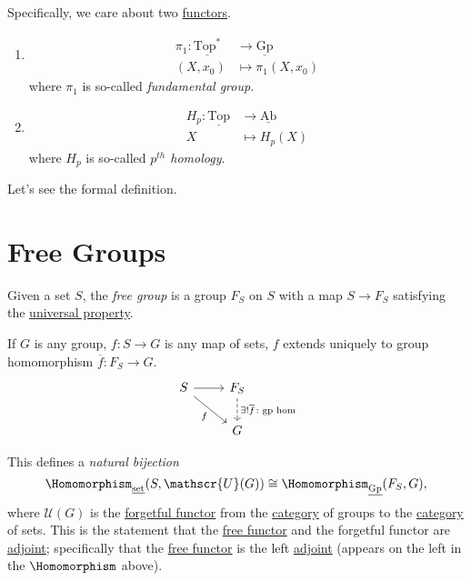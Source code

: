 \begin{remark}
	Specifically, we care about two \hyperref[def:functor]{functors}.
	\begin{enumerate}
		\item
		      \[
			      \begin{split}
				      \pi _1\colon \underline{\mathrm{Top}^*} &\to \underline{\mathrm{Gp}} \\
				      (X, x_0)&\mapsto \pi_1(X, x_0)
			      \end{split}
		      \]
		      where \(\pi _1\) is so-called \emph{fundamental group}.
		\item
		      \[
			      \begin{split}
				      H_p\colon \underline{\mathrm{Top}} &\to \underline{\mathrm{Ab}} \\
				      X&\mapsto H_{p} (X)
			      \end{split}
		      \]
		      where \(H_{p}\) is so-called \emph{\(p^{th}\) homology}.
	\end{enumerate}
\end{remark}

Let's see the formal definition.

\section{Free Groups}
\begin{definition}\label{def:free-group}
	Given a set \(S\), the \emph{free group} is a group \(F_S\) on \(S\) with a map \(S\to F_S\) satisfying the
	\underline{universal property}.

	If \(G\) is any group, \(f\colon S\to G\) is any map of sets, \(f\) extends uniquely to group homomorphism \(\overline{f} \colon F_S \to G\).
	\[
		\begin{tikzcd}
			S \ar[rd, "f"']\ar[r, ] & F_S\ar[d, dashed, "\exists ! \overline{f} \colon \text{gp hom} "]\\
			& G
		\end{tikzcd}
	\]
\end{definition}
\begin{note}
	This defines a \emph{natural bijection}
	\[
		\Homomorphism_{\underline{\mathrm{set}}}(S, \mathscr{U}(G))\cong \Homomorphism_{\underline{\mathrm{Gp}}}(F_S, G),
	\]
	where \(\mathscr{U} (G)\) is the \hyperref[eg:forgetful-functor]{forgetful functor} from the
	\hyperref[def:category]{category} of groups to the \hyperref[def:category]{category} of sets. This is the
	statement that the \hyperref[eg:free-functor]{free functor} and the forgetful functor are \hyperref[def:adjoint-functor]{adjoint};
	specifically that the \hyperref[eg:free-functor]{free functor} is the left \hyperref[def:adjoint-functor]{adjoint} (appears on the left in the \(\Homomorphism\) above).
\end{note}

